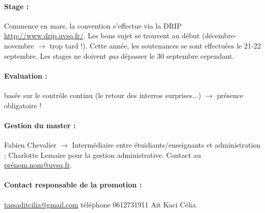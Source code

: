 \documentclass{article}
\begin{document}
\paragraph{Stage :} Commence en mars, la convention s'effectue via la DRIP \url{http://www.drip.uvsq.fr/}. Les bons sujet se trouvent au début (décembre-novembre $\to$ trop tard !). Cette année, les soutenances se sont effectuées le 21-22 septembre. Les stages ne doivent \emph{pas} dépasser le 30 septembre cependant.

\paragraph{Evaluation :} basée sur le contrôle continu (le retour des interros surprises...) $\to$ présence obligatoire !

\paragraph{Gestion du master :} Fabien Chevalier $\to$ Intermédiaire entre étuidiants/enseignants et administration ; Charlotte Lemaire pour la gestion administrative. Contact au \url{prénom.nom@uvsq.fr}.

\paragraph{Contact responsable de la promotion :}\url{tassaditcilia@gmail.com} téléphone 0612731911 Ait Kaci Célia
\end{document}
